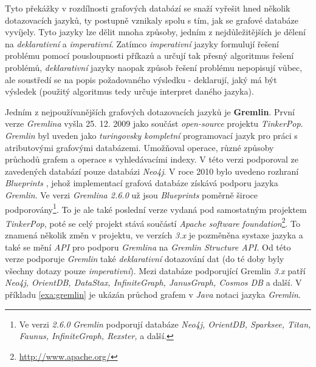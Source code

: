 Tyto překážky v rozdílnosti grafových databází se snaží vyřešit hned několik dotazovacích jazyků, ty postupně vznikaly spolu s tím, jak se grafové databáze vyvíjely. Tyto jazyky lze dělit mnoha způsoby, jedním z nejdůležitějších je dělení na \textit{deklarativní} a \textit{imperativní}. Zatímco \textit{imperativní} jazyky formulují řešení problému pomocí pousloupnosti příkazů a určují tak přesný algoritmus řešení problémů, \textit{deklarativní} jazyky naopak způsob řešení problému nepopisují vůbec, ale soustředí se na popis požadovaného výsledku - deklarují, jaký má být výsledek (použitý algoritmus tedy určuje interpret daného jazyka).\cite{Chao16}

Jedním z nejpoužívanějších grafových dotazovacích jazyků je \textbf{Gremlin}. První verze \textit{Gremlina} vyšla 25. 12. 2009 \cite{Gremlin09} jako součást \textit{open-source} projektu \textit{TinkerPop}. \textit{Gremlin} byl uveden jako \textit{turingovsky kompletní} programovací jazyk pro práci s atributovými grafovými databázemi. Umožňoval \textit{} operace, různé způsoby průchodů grafem a operace s vyhledávacími indexy. V této verzi podporoval ze zavedených databází pouze databázi \textit{Neo4j}. 
V roce 2010 bylo uvedeno rozhraní \textit{Blueprints} \cite{Blueprints10}, jehož implementací grafová databáze získává podporu jazyka \textit{Gremlin}. 
Ve verzi \textit{Gremlina 2.6.0} \cite{Gremlin14} už jsou \textit{Blueprints} poměrně široce podporovány\footnote{Ve verzi \textit{2.6.0} \textit{Gremlin} podporují databáze \textit{Neo4j, OrientDB, Sparksee, Titan, Faunus, InfiniteGraph, Rexster,} a další.}. To je ale také poslední verze vydaná pod samostatným projektem \textit{TinkerPop}, poté se celý projekt stává součástí \textit{Apache software foundation}\footnote{\url{http://www.apache.org/}}. To znamená několik změn v projektu, ve verzích \textit{3.x} \cite{Gremlin17} je pozměněna systaxe jazyka a také se mění \textit{API} pro podporu \textit{Gremlina} na \textit{Gremlin Structure API}. Od této verze podporuje \textit{Gremlin} také \textit{deklarativní} dotazování dat (do té doby byly všechny dotazy pouze \textit{imperativní}).  Mezi databáze podporující Gremlin \textit{3.x} patří \textit{Neo4j, OrientDB, DataStax, InfiniteGraph, JanusGraph, Cosmos DB} a další. V příkladu \ref{exa:gremlin} je ukázán průchod grafem v \textit{Java} notaci jazyka \textit{Gremlin}.



